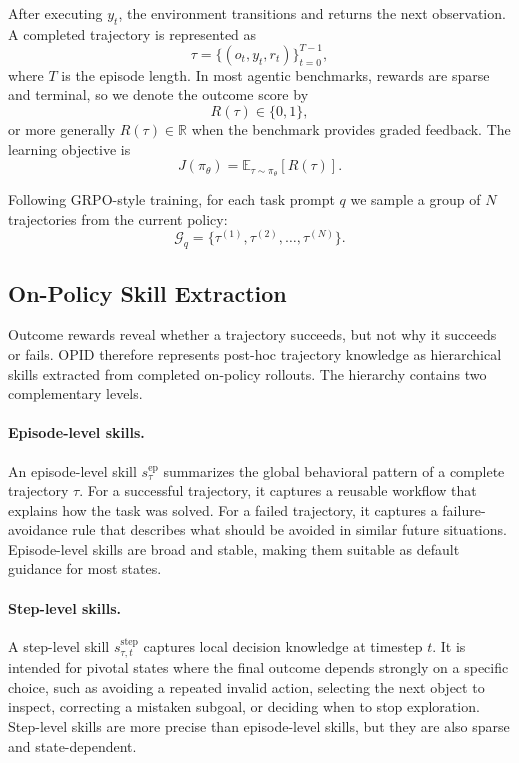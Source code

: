 \documentclass{llmxive}
\providecommand{\E}{\mathbb{E}}
\begin{document}
After executing $y_t$, the environment transitions and returns the next observation. A completed trajectory is represented as
\begin{equation*}
    \tau = \{(o_t, y_t, r_t)\}_{t=0}^{T-1},
\end{equation*}
where $T$ is the episode length. In most agentic benchmarks, rewards are sparse and terminal, so we denote the outcome score by
\begin{equation*}
    R(\tau) \in \{0,1\},
\end{equation*}
or more generally $R(\tau)\in\mathbb{R}$ when the benchmark provides graded feedback. The learning objective is
\begin{equation*}
    J(\pi_\theta) = \E_{\tau\sim\pi_\theta}[R(\tau)].
\end{equation*}

Following GRPO-style training, for each task prompt $q$ we sample a group of $N$ trajectories from the current policy:
\begin{equation*}
    \mathcal{G}_q = \{\tau^{(1)}, \tau^{(2)}, \ldots, \tau^{(N)}\}.
\end{equation*}


\subsection{On-Policy Skill Extraction}

Outcome rewards reveal whether a trajectory succeeds, but not why it succeeds or fails. OPID{} therefore represents post-hoc trajectory knowledge as hierarchical skills extracted from completed on-policy rollouts. The hierarchy contains two complementary levels.

\paragraph{Episode-level skills.}
An episode-level skill $s^{\mathrm{ep}}_{\tau}$ summarizes the global behavioral pattern of a complete trajectory $\tau$. For a successful trajectory, it captures a reusable workflow that explains how the task was solved. For a failed trajectory, it captures a failure-avoidance rule that describes what should be avoided in similar future situations. Episode-level skills are broad and stable, making them suitable as default guidance for most states.

\paragraph{Step-level skills.}
A step-level skill $s^{\mathrm{step}}_{\tau,t}$ captures local decision knowledge at timestep $t$. It is intended for pivotal states where the final outcome depends strongly on a specific choice, such as avoiding a repeated invalid action, selecting the next object to inspect, correcting a mistaken subgoal, or deciding when to stop exploration. Step-level skills are more precise than episode-level skills, but they are also sparse and state-dependent.
\end{document}
